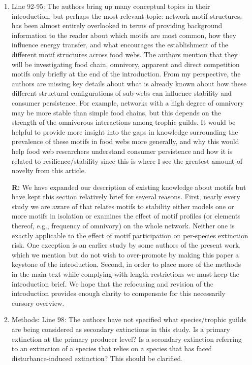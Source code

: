 \documentclass[12pt]{article}
\begin{document}
\begin{enumerate}
            
            \item Line 92-95: The authors bring up many conceptual topics in their introduction, but perhaps the most relevant topic: network motif structures, has been almost entirely overlooked in terms of providing background information to the reader about which motifs are most common, how they influence energy transfer, and what encourages the establishment of the different motif structures across food webs. The authors mention that they will be investigating food chain, omnivory, apparent and direct competition motifs only briefly at the end of the introduction. From my perspective, the authors are missing key details about what is already known about how these different structural configurations of sub-webs can influence stability and consumer persistence. For example, networks with a high degree of omnivory may be more stable than simple food chains, but this depends on the strength of the omnivorous interactions among trophic guilds. It would be helpful to provide more insight into the gaps in knowledge surrounding the prevalence of these motifs in food webs more generally, and why this would help food web researchers understand consumer persistence and how it is related to resilience/stability since this is where I see the greatest amount of novelty from this article.

                \textbf{R:} We have expanded our description of existing knowledge about motifs but have kept this section relatively brief for several reasons. First, nearly every study we are aware of that relates motifs to stability either models one or more motifs in isolation or examines the effect of motif profiles (or elements thereof, e.g., frequency of omnivory) on the whole network. Neither one is exactly applicable to the effect of motif participation on per-species extinction risk. One exception is an earlier study by some authors of the present work, which we mention but do not wish to over-promote by making this paper a keystone of the introduction. Second, in order to place more of the methods in the main text while complying with length restrictions we must keep the introduction brief.
                We hope that the refocusing and revision of the introduction provides enough clarity to compensate for this necessarily cursory overview.


            \item Methods: Line 98: The authors have not specified what species/trophic guilds are being considered as secondary extinctions in this study. Is a primary extinction at the primary producer level? Is a secondary extinction referring to an extinction of a species that relies on a species that has faced disturbance-induced extinction? This should be clarified.


\end{enumerate}
\end{document}
